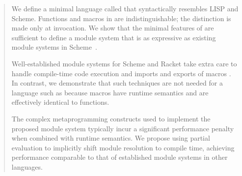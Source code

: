 \begin{abstract}
We define a minimal language called \lang that syntactically resembles LISP and
Scheme. Functions and macros in \lang are indistinguishable; the distinction is
made only at invocation. We show that the minimal features of \lang are
sufficient to define a module system that is as expressive as existing module
systems in Scheme~\cite{r6rs}.

Well-established module systems for Scheme and Racket take extra care to handle
compile-time code execution and imports and exports of macros
\cite{module-system-for-scheme,submodules-in-racket}. In contrast, we
demonstrate that such techniques are not needed for a language such as \lang
because macros have runtime semantics and are effectively identical to
functions.

The complex metaprogramming constructs used to implement the proposed module
system typically incur a significant performance penalty when combined with
runtime semantics. We propose using partial evaluation to implicitly shift
module resolution to compile time, achieving performance comparable to that of
established module systems in other languages.
\end{abstract}
